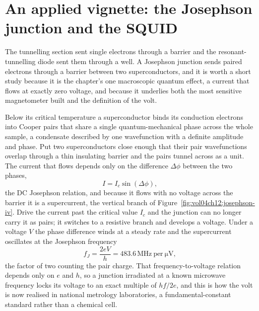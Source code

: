 \section{An applied vignette: the Josephson junction and the SQUID}

The tunnelling section sent single electrons through a barrier and the
resonant-tunnelling diode sent them through a well. A Josephson junction
sends paired electrons through a barrier between two superconductors, and
it is worth a short study because it is the chapter's one macroscopic
quantum effect, a current that flows at exactly zero voltage, and because
it underlies both the most sensitive magnetometer built and the definition
of the volt.

Below its critical temperature a superconductor binds its conduction
electrons into Cooper pairs that share a single quantum-mechanical phase
across the whole sample, a condensate described by one wavefunction with a
definite amplitude and phase. Put two superconductors close enough that
their pair wavefunctions overlap through a thin insulating barrier and the
pairs tunnel across as a unit. The current that flows depends only on the
difference $\Delta\phi$ between the two phases,
\[
I = I_c\sin(\Delta\phi),
\]
the DC Josephson relation, and because it flows with no voltage across the
barrier it is a supercurrent, the vertical branch of
Figure~\ref{fig:vol04ch12:josephson-iv}. Drive the current past the
critical value $I_c$ and the junction can no longer carry it as pairs; it
switches to a resistive branch and develops a voltage. Under a voltage $V$
the phase difference winds at a steady rate and the supercurrent
oscillates at the Josephson frequency
\[
f_J = \frac{2eV}{h} = 483.6\,\si{\mega\hertz}\ \text{per}\ \si{\micro\volt},
\]
the factor of two counting the pair charge. That frequency-to-voltage
relation depends only on $e$ and $h$, so a junction irradiated at a known
microwave frequency locks its voltage to an exact multiple of $hf/2e$, and
this is how the volt is now realised in national metrology laboratories, a
fundamental-constant standard rather than a chemical cell.

